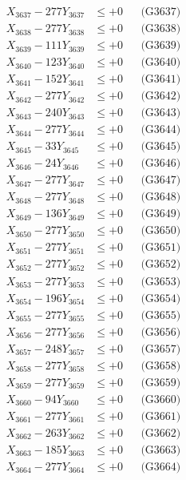 \documentclass[a4paper,10pt]{article}
\begin{document}
{\begin{align}
X_{3637} - 277Y_{3637} &\leq +0 && \text{(G3637)} \\
X_{3638} - 277Y_{3638} &\leq +0 && \text{(G3638)} \\
X_{3639} - 111Y_{3639} &\leq +0 && \text{(G3639)} \\
X_{3640} - 123Y_{3640} &\leq +0 && \text{(G3640)} \\
\allowbreak
X_{3641} - 152Y_{3641} &\leq +0 && \text{(G3641)} \\
X_{3642} - 277Y_{3642} &\leq +0 && \text{(G3642)} \\
X_{3643} - 240Y_{3643} &\leq +0 && \text{(G3643)} \\
X_{3644} - 277Y_{3644} &\leq +0 && \text{(G3644)} \\
X_{3645} - 33Y_{3645} &\leq +0 && \text{(G3645)} \\
X_{3646} - 24Y_{3646} &\leq +0 && \text{(G3646)} \\
X_{3647} - 277Y_{3647} &\leq +0 && \text{(G3647)} \\
X_{3648} - 277Y_{3648} &\leq +0 && \text{(G3648)} \\
X_{3649} - 136Y_{3649} &\leq +0 && \text{(G3649)} \\
X_{3650} - 277Y_{3650} &\leq +0 && \text{(G3650)} \\
\allowbreak
X_{3651} - 277Y_{3651} &\leq +0 && \text{(G3651)} \\
X_{3652} - 277Y_{3652} &\leq +0 && \text{(G3652)} \\
X_{3653} - 277Y_{3653} &\leq +0 && \text{(G3653)} \\
X_{3654} - 196Y_{3654} &\leq +0 && \text{(G3654)} \\
X_{3655} - 277Y_{3655} &\leq +0 && \text{(G3655)} \\
X_{3656} - 277Y_{3656} &\leq +0 && \text{(G3656)} \\
X_{3657} - 248Y_{3657} &\leq +0 && \text{(G3657)} \\
X_{3658} - 277Y_{3658} &\leq +0 && \text{(G3658)} \\
X_{3659} - 277Y_{3659} &\leq +0 && \text{(G3659)} \\
X_{3660} - 94Y_{3660} &\leq +0 && \text{(G3660)} \\
\allowbreak
X_{3661} - 277Y_{3661} &\leq +0 && \text{(G3661)} \\
X_{3662} - 263Y_{3662} &\leq +0 && \text{(G3662)} \\
X_{3663} - 185Y_{3663} &\leq +0 && \text{(G3663)} \\
X_{3664} - 277Y_{3664} &\leq +0 && \text{(G3664)} \\

\end{align}}
\end{document}

